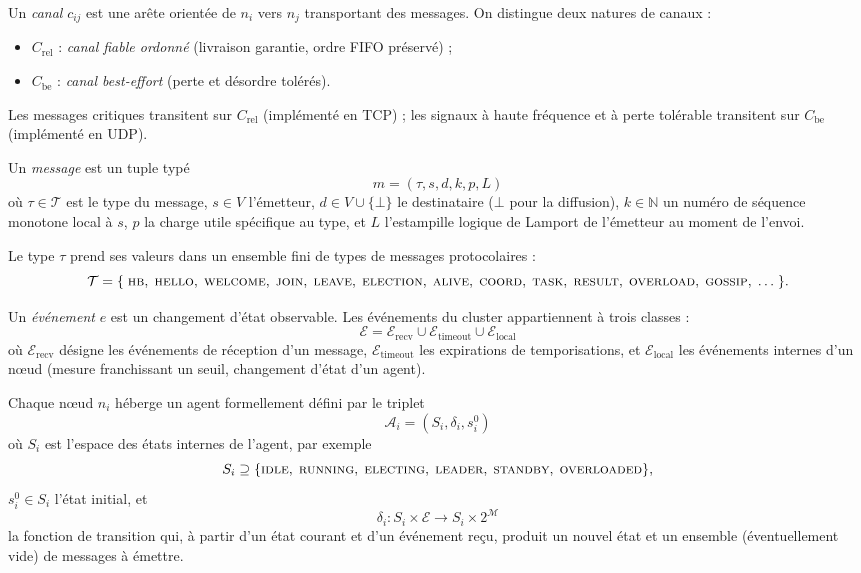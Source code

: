 \begin{definition}
Un \emph{canal} $c_{ij}$ est une arête orientée de $n_i$ vers $n_j$ transportant des messages. On distingue deux natures de canaux :
\begin{itemize}
    \item $C_{\mathrm{rel}}$ : \emph{canal fiable ordonné} (livraison garantie, ordre FIFO préservé) ;
    \item $C_{\mathrm{be}}$ : \emph{canal best-effort} (perte et désordre tolérés).
\end{itemize}
Les messages critiques transitent sur $C_{\mathrm{rel}}$ (implémenté en TCP) ; les signaux à haute fréquence et à perte tolérable transitent sur $C_{\mathrm{be}}$ (implémenté en UDP).
\end{definition}

\begin{definition}[Message]
Un \emph{message} est un tuple typé
\[
m = (\tau, s, d, k, p, L)
\]
où $\tau \in \mathcal{T}$ est le type du message, $s \in V$ l'émetteur, $d \in V \cup \{\bot\}$ le destinataire ($\bot$ pour la diffusion), $k \in \mathbb{N}$ un numéro de séquence monotone local à $s$, $p$ la charge utile spécifique au type, et $L$ l'estampille logique de Lamport de l'émetteur au moment de l'envoi.
\end{definition}

Le type $\tau$ prend ses valeurs dans un ensemble fini de types de messages protocolaires :
\[
\mathcal{T} = \{\; \textsc{hb},\; \textsc{hello},\; \textsc{welcome},\; \textsc{join},\; \textsc{leave},\;
\textsc{election},\; \textsc{alive},\; \textsc{coord},\;
\textsc{task},\; \textsc{result},\; \textsc{overload},\; \textsc{gossip},\; \ldots \;\}.
\]

\begin{definition}[Événement]
Un \emph{événement} $e$ est un changement d'état observable. Les événements du cluster appartiennent à trois classes :
\[
\mathcal{E} = \mathcal{E}_{\mathrm{recv}} \cup \mathcal{E}_{\mathrm{timeout}} \cup \mathcal{E}_{\mathrm{local}}
\]
où $\mathcal{E}_{\mathrm{recv}}$ désigne les événements de réception d'un message, $\mathcal{E}_{\mathrm{timeout}}$ les expirations de temporisations, et $\mathcal{E}_{\mathrm{local}}$ les événements internes d'un nœud (mesure franchissant un seuil, changement d'état d'un agent).
\end{definition}

\begin{definition}[Agent]
Chaque nœud $n_i$ héberge un agent formellement défini par le triplet
\[
\mathcal{A}_i = (S_i, \delta_i, s_i^{0})
\]
où $S_i$ est l'espace des états internes de l'agent, par exemple
\[
S_i \supseteq \{\textsc{idle},\; \textsc{running},\; \textsc{electing},\; \textsc{leader},\; \textsc{standby},\; \textsc{overloaded}\},
\]
$s_i^{0} \in S_i$ l'état initial, et
\[
\delta_i : S_i \times \mathcal{E} \longrightarrow S_i \times 2^{\mathcal{M}}
\]
la fonction de transition qui, à partir d'un état courant et d'un événement reçu, produit un nouvel état et un ensemble (éventuellement vide) de messages à émettre.
\end{definition}

